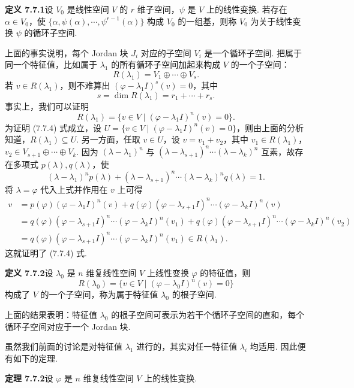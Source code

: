 \documentclass[UTF8,12pt,a4paper,fontset=fandol]{ctexart}
\begin{document}
\noindent\textbf{定义 7.7.1}\quad 设 $V_0$ 是线性空间 $V$ 的 $r$ 维子空间，$\psi$ 是 $V$ 上的线性变换. 若存在 $\alpha\in V_0$，使 $\{\alpha,\psi(\alpha),\cdots,\psi^{r-1}(\alpha)\}$ 构成 $V_0$ 的一组基，则称 $V_0$ 为关于线性变换 $\psi$ 的循环子空间.

上面的事实说明，每个 Jordan 块 $J_i$ 对应的子空间 $V_i$ 是一个循环子空间. 把属于同一个特征值，比如属于 $\lambda_1$ 的所有循环子空间加起来构成 $V$ 的一个子空间：
\[
R(\lambda_1)=V_1\oplus\cdots\oplus V_s.
\]
若 $v\in R(\lambda_1)$，则不难算出 $(\varphi-\lambda_1I)^s(v)=0$，其中
\[
s=\dim R(\lambda_1)=r_1+\cdots+r_s.
\]
事实上，我们可以证明
\begin{equation}
R(\lambda_1)=\{v\in V\mid(\varphi-\lambda_1I)^n(v)=0\}.
\tag{7.7.4}
\end{equation}
为证明 (7.7.4) 式成立，设 $U=\{v\in V\mid(\varphi-\lambda_1I)^n(v)=0\}$，则由上面的分析知道，$R(\lambda_1)\subseteq U$. 另一方面，任取 $v\in U$，设 $v=v_1+v_2$，其中 $v_1\in R(\lambda_1)$，$v_2\in V_{s+1}\oplus\cdots\oplus V_k$. 因为 $(\lambda-\lambda_1)^n$ 与 $(\lambda-\lambda_{s+1})^n\cdots(\lambda-\lambda_k)^n$ 互素，故存在多项式 $p(\lambda),q(\lambda)$，使
\[
(\lambda-\lambda_1)^np(\lambda)+(\lambda-\lambda_{s+1})^n\cdots(\lambda-\lambda_k)^nq(\lambda)=1.
\]
将 $\lambda=\varphi$ 代入上式并作用在 $v$ 上可得
\[
\begin{aligned}
v&=p(\varphi)(\varphi-\lambda_1I)^n(v)+q(\varphi)(\varphi-\lambda_{s+1}I)^n\cdots(\varphi-\lambda_kI)^n(v)\\
&=q(\varphi)(\varphi-\lambda_{s+1}I)^n\cdots(\varphi-\lambda_kI)^n(v_1)+q(\varphi)(\varphi-\lambda_{s+1}I)^n\cdots(\varphi-\lambda_kI)^n(v_2)\\
&=q(\varphi)(\varphi-\lambda_{s+1}I)^n\cdots(\varphi-\lambda_kI)^n(v_1)\in R(\lambda_1).
\end{aligned}
\]
这就证明了 (7.7.4) 式.

\noindent\textbf{定义 7.7.2}\quad 设 $\lambda_0$ 是 $n$ 维复线性空间 $V$ 上线性变换 $\varphi$ 的特征值，则
\[
R(\lambda_0)=\{v\in V\mid(\varphi-\lambda_0I)^n(v)=0\}
\]
构成了 $V$ 的一个子空间，称为属于特征值 $\lambda_0$ 的根子空间.

上面的结果表明：特征值 $\lambda_0$ 的根子空间可表示为若干个循环子空间的直和，每个循环子空间对应于一个 Jordan 块.

虽然我们前面的讨论是对特征值 $\lambda_1$ 进行的，其实对任一特征值 $\lambda_i$ 均适用. 因此便有如下的定理.

\noindent\textbf{定理 7.7.2}\quad 设 $\varphi$ 是 $n$ 维复线性空间 $V$ 上的线性变换.
\end{document}
